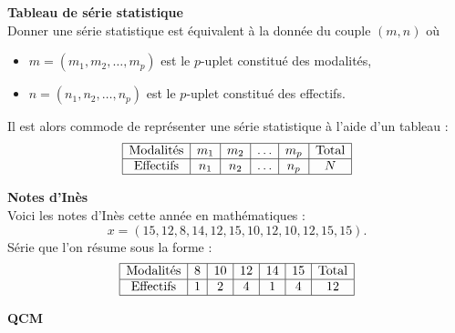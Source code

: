 \documentclass[../PolyS4.tex]{subfiles}
\begin{document}
\begin{Def}\textbf{Tableau de série statistique}\\

Donner une série statistique est équivalent à la donnée du couple $(m, n)$ où
\begin{itemize}
    \item $m = (m_1, m_2, \ldots, m_p)$ est le $p$-uplet constitué des modalités,
    \item $n = (n_1, n_2, \ldots, n_p)$ est le $p$-uplet constitué des effectifs.
\end{itemize}

Il est alors commode de représenter une série statistique à l'aide d'un tableau :
\[
\begin{array}{|c|c|c|c|c|c|}
\hline
\text{Modalités} & m_1 & m_2 & \ldots & m_p & \text{Total} \\
\hline
\text{Effectifs} & n_1 & n_2 & \ldots & n_p & N \\
\hline
\end{array}
\]
\end{Def}

\begin{Ex}\textbf{Notes d'Inès}\\

Voici les notes d'Inès cette année en mathématiques :
\[
x = (15, 12, 8, 14, 12, 15, 10, 12, 10, 12, 15, 15).
\]
Série que l'on résume sous la forme :
\[
\begin{array}{|c|c|c|c|c|c|c|}
\hline
\text{Modalités} & 8 & 10 & 12 & 14 & 15 & \text{Total} \\
\hline
\text{Effectifs} & 1 & 2 & 4 & 1 & 4 & 12 \\
\hline
\end{array}
\]
\end{Ex}


\textbf{QCM}
\end{document}
